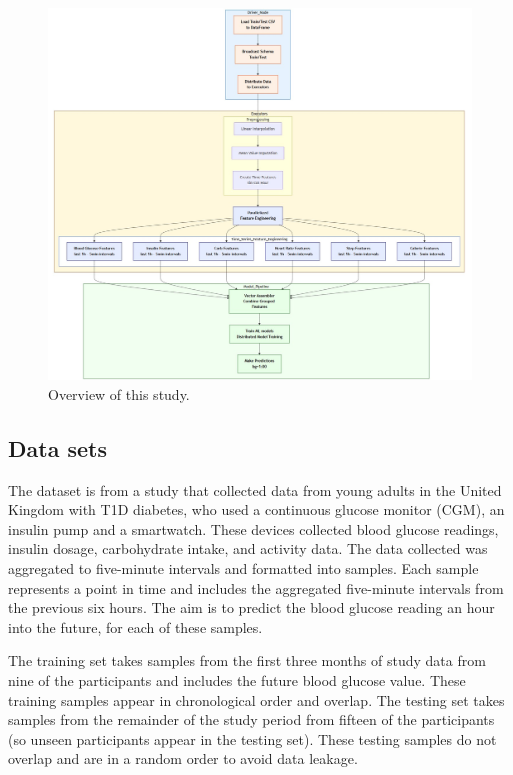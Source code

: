 \documentclass[
	a4paper, %
	10pt, %
	unnumberedsections, %
	twoside, %
]{LTJournalArticle}
\begin{document}
\begin{figure}
	\centering
	\includegraphics[width=1\linewidth]{./Figures/overview.jpg}
	\caption{Overview of this study.}
	\label{fig:dataprocessing}
\end{figure}

\subsection{Data sets}

The dataset is from a study that collected data from young adults in the United Kingdom with T1D diabetes, who used a continuous glucose monitor (CGM), an insulin pump and a smartwatch. These devices collected blood glucose readings, insulin dosage, carbohydrate intake, and activity data. The data collected was aggregated to five-minute intervals and formatted into samples. Each sample represents a point in time and includes the aggregated five-minute intervals from the previous six hours. The aim is to predict the blood glucose reading an hour into the future, for each of these samples.

The training set takes samples from the first three months of study data from nine of the participants and includes the future blood glucose value. These training samples appear in chronological order and overlap. The testing set takes samples from the remainder of the study period from fifteen of the participants (so unseen participants appear in the testing set). These testing samples do not overlap and are in a random order to avoid data leakage.
\end{document}
